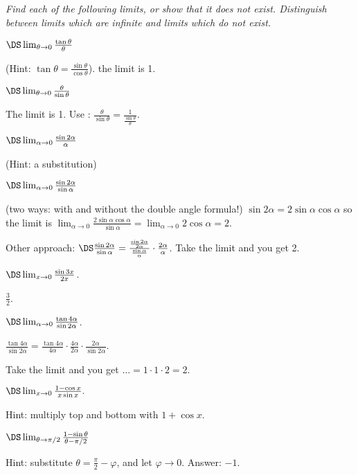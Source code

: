 \noindent\itshape
Find each of the following limits, \emph{or} show that it does not exist.
Distinguish between limits which are infinite and limits which do not
exist.\upshape

\begin{multicols}{3}\setlength{\parindent}{0pt}
\problem $\DS \lim_{\theta\to0} \frac{\tan \theta}{\theta}$

(Hint: $\tan\theta = \frac{\sin\theta}{\cos \theta}$).
\answer
the limit is 1.
\endanswer

\problem $\DS \lim_{\theta\to0} \frac{\theta}{\sin \theta}$

\answer
The limit is 1.
Use : 
$\frac{\theta}{\sin\theta} = \frac{1}{\frac{\sin\theta}{\theta}}$.
\endanswer

\problem $\DS \lim_{\alpha\to0}\frac{\sin 2\alpha}{\alpha}$

(Hint: a substitution)


\problem $\DS \lim_{\alpha\to0}\frac{\sin 2\alpha}{\sin\alpha}$

(two ways: with and without the double angle formula!)
\answer
$\sin 2\alpha = 2\sin\alpha\cos\alpha$ so the limit is
$\lim_{\alpha\to0} \frac{2\sin\alpha\cos\alpha}{\sin\alpha} =
\lim_{\alpha\to0} 2\cos\alpha = 2$.

Other approach: $\DS\frac{\sin2\alpha}{\sin\alpha} =
\frac{\frac{\sin2\alpha}{2\alpha}}{\frac{\sin\alpha}{\alpha}}\cdot
\frac{2\alpha}{\alpha}$. Take the limit and you get 2.
\endanswer

\problem $\DS \lim_{x\to0}\frac{\sin 3x}{2x}$.

\answer
$\frac{3}{2}$.
\endanswer



\problem $\DS \lim_{\alpha\to0}\frac{\tan 4\alpha}{\sin 2\alpha}$.

\answer
$\frac{\tan 4\alpha}{\sin 2\alpha}
= \frac{\tan 4\alpha}{4\alpha}\cdot
\frac{4\alpha}{2\alpha}\cdot \frac{2\alpha}{\sin2\alpha}$.

Take the limit and you get $\ldots = 1\cdot1\cdot2 = 2$.
\endanswer

\problem $\DS \lim_{x\to 0} \frac{1-\cos x}{ x \sin x}.$

\answer
Hint: multiply top and bottom with \(1+\cos x\).
\endanswer

\problem $\DS\lim_{\theta\to\pi/2}\frac{1-\sin\theta}{\theta-\pi/2}$

\answer
Hint: substitute $\theta = \frac{\pi}{2} - \varphi$, and let
$\varphi\to 0$.  Answer: $-1$.
\endanswer


\end{multicols}
